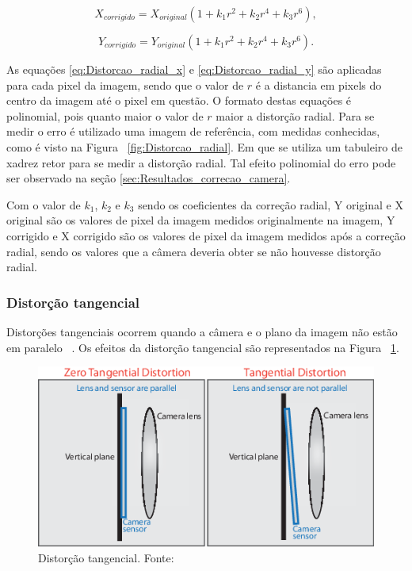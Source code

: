 \begin{equation}
	X_{corrigido} = X_{original} (1 + k_1 r^2 + k_2 r^4 + k_3 r^6),
	\label{eq:Distorcao_radial_x}
\end{equation}

\begin{equation}
	Y_{corrigido} = Y_{original} (1 + k_1 r^2 + k_2 r^4 + k_3 r^6).
	\label{eq:Distorcao_radial_y}
\end{equation}

As equações \ref{eq:Distorcao_radial_x} e \ref{eq:Distorcao_radial_y} são aplicadas para cada pixel da imagem, 
sendo que o valor de $r$ é a distancia em pixels do centro da imagem até o pixel em questão.
O formato destas equações é polinomial, pois quanto maior o valor de $r$ maior a distorção radial.
Para se medir o erro é utilizado uma imagem de referência, com medidas conhecidas, como é visto na Figura ~\ref{fig:Distorcao_radial}.
Em que se utiliza um tabuleiro de xadrez retor para se medir a distorção radial.
Tal efeito polinomial do erro pode ser observado na seção \ref{sec:Resultados_correcao_camera}.

Com o valor de $k_1$, $k_2$ e $k_3$ sendo os coeficientes da correção radial, 
Y original e X original são os valores de pixel da imagem medidos originalmente na imagem,
Y corrigido e X corrigido são os valores de pixel da imagem medidos após a correção radial, 
sendo os valores que a câmera deveria obter se não houvesse distorção radial. 

\subsubsection{Distorção tangencial}
Distorções tangenciais ocorrem quando a câmera e o plano da imagem não estão em paralelo ~\cite[]{ozcakir_2020}.
Os efeitos da distorção tangencial são representados na Figura ~\ref{fig:Distorcao_tangencial}.

\begin{figure}[H]
	\centering
	\includegraphics[width=.7\columnwidth]{images/Distorcao_tangencial.png}
	\caption{Distorção tangencial. Fonte: ~\cite[]{ozcakir_2020}}
	\label{fig:Distorcao_tangencial}
\end{figure}

